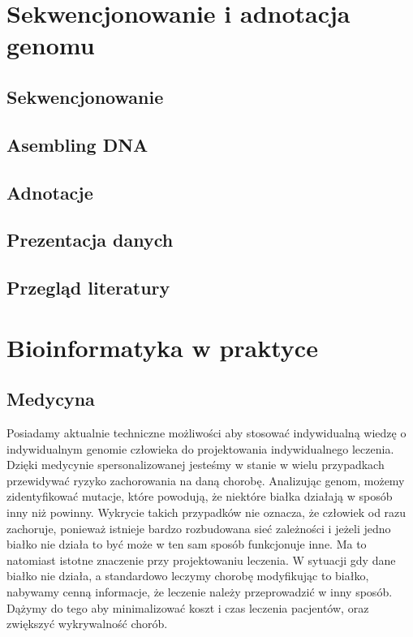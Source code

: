\chapter{Sekwencjonowanie i adnotacja genomu}
\label{section:biologiny_wstep}

\section{Sekwencjonowanie}

\section{Asembling DNA}

\section{Adnotacje}

\section{Prezentacja danych}

\section{Przegląd literatury}

\chapter{Bioinformatyka w praktyce}

\section{Medycyna}
Posiadamy aktualnie techniczne możliwości aby stosować indywidualną wiedzę o indywidualnym genomie człowieka do projektowania indywidualnego leczenia. Dzięki medycynie spersonalizowanej jesteśmy w stanie w wielu przypadkach przewidywać ryzyko zachorowania na daną chorobę. Analizując genom, możemy zidentyfikować mutacje, które powodują, że niektóre białka działają w sposób inny niż powinny. Wykrycie takich przypadków nie oznacza, że człowiek od razu zachoruje, ponieważ istnieje bardzo rozbudowana sieć zależności i jeżeli jedno białko nie działa to być może w ten sam sposób funkcjonuje inne. Ma to natomiast istotne znaczenie przy projektowaniu leczenia. W sytuacji gdy dane białko nie działa, a standardowo leczymy chorobę modyfikując to białko, nabywamy cenną informacje, że leczenie należy przeprowadzić w inny sposób. Dążymy do tego aby minimalizować koszt i czas leczenia pacjentów, oraz zwiększyć wykrywalność chorób.

